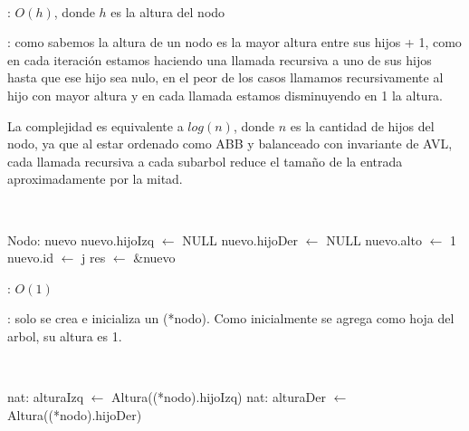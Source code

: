 \begin{Algoritmos}
	~

	\begin{algorithm}[H]
		\NoCaptionOfAlgo
		\caption{}
		\BlankLine
	\end{algorithm}

	\complejidad: $O(h)$, donde $h$ es la altura del nodo

	\justifcomp: como sabemos la altura de un nodo es la mayor altura entre sus hijos + 1, como en cada iteración estamos haciendo una llamada recursiva a uno de sus hijos hasta que ese hijo sea nulo, en el peor de los casos llamamos recursivamente al hijo con mayor altura y en cada llamada estamos disminuyendo en 1 la altura.

	La complejidad es equivalente a $log(n)$, donde $n$ es la cantidad de hijos del nodo, ya que al estar ordenado como ABB y balanceado con invariante de AVL, cada llamada recursiva a cada subarbol reduce el tamaño de la entrada aproximadamente por la mitad.

	~

	\begin{algorithm}[H]
		\NoCaptionOfAlgo
		\caption{}
		\BlankLine
		Nodo: nuevo
		nuevo.hijoIzq $\leftarrow$ NULL
		nuevo.hijoDer $\leftarrow$ NULL
		nuevo.alto $\leftarrow$ 1
		nuevo.id $\leftarrow$ j
		res $\leftarrow$ \&nuevo
	\end{algorithm}
	
	\complejidad: $O(1)$

	\justifcomp: solo se crea e inicializa un (*nodo). Como inicialmente se agrega como hoja del arbol, su altura es 1.

	~

	\begin{algorithm}[H]
		\NoCaptionOfAlgo
		\caption{}
		\BlankLine
		nat: alturaIzq $\leftarrow$ Altura((*nodo).hijoIzq)
		nat: alturaDer $\leftarrow$ Altura((*nodo).hijoDer)
	\end{algorithm}
	

\end{Algoritmos}
